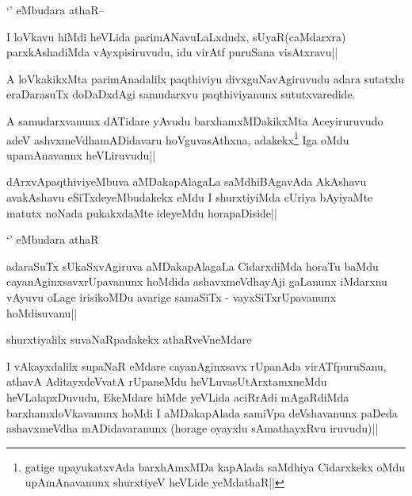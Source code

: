 \begin{artha}
`\stext' eMbudara athaR--
\end{artha}

\begin{artha}
I loVkavu hiMdi heVLida parimANavuLaLxdudx, sUyaR(caMdarxra) parxkAshadiMda vAyxpisiruvudu, idu virAtf puruSana visAtxravu||
\end{artha}

\begin{artha}
A loVkakikxMta parimAnadalilx paqthiviyu divxguNavAgiruvudu adara sutatxlu eraDarasuTx doDaDxdAgi samudarxvu paqthiviyanunx sututxvaredide.
\end{artha}

\begin{artha}
A samudarxvanunx dATidare yAvudu barxhamxMDakikxMta Aceyiruruvudo adeV ashvxmeVdhamADidavaru hoVguvasAthxna, adakekx\footnote{gatige upayukatxvAda barxhAmxMDa  kapAlada saMdhiya Cidarxkekx oMdu upAmAnavanunx shurxtiyeV heVLide yeMdathaR||} Iga oMdu upamAnavannx heVLiruvudu||
\end{artha}

\begin{artha}
dArxvApaqthiviyeMbuva aMDakapAlagaLa saMdhiBAgavAda AkAshavu avakAshavu eSiTxdeyeMbudakekx \stext eMdu I shurxtiyiMda cUriya bAyiyaMte matutx noNada pukakxdaMte ideyeMdu horapaDiside|| 
\end{artha}

\begin{artha}
`\stext' eMbudara athaR
\end{artha}

\begin{artha}
adaraSuTx sUkaSxvAgiruva aMDakapAlagaLa CidarxdiMda horaTu baMdu cayanAginxsavxrUpavanunx hoMdida ashavxmeVdhayAji gaLanunx iMdarxnu vAyuvu oLage irisikoMDu avarige samaSiTx - vayxSiTxrUpavanunx hoMdisuvanu||
\end{artha}

\begin{artha}
shurxtiyalilx suvaNaRpadakekx athaRveVneMdare
\end{artha}

\begin{artha}
I vAkayxdalilx supaNaR eMdare cayanAginxsavx rUpanAda virATfpuruSanu, athavA AditayxdeVvatA rUpaneMdu heVLuvasUtArxtamxneMdu heVLalapxDuvudu, EkeMdare hiMde yeVLida aciRrAdi mAgaRdiMda barxhamxloVkavanunx hoMdi I aMDakapAlada samiVpa deVshavanunx paDeda ashavxmeVdha mADidavaranunx (horage oyayxlu sAmathayxRvu iruvudu)||
\end{artha}

